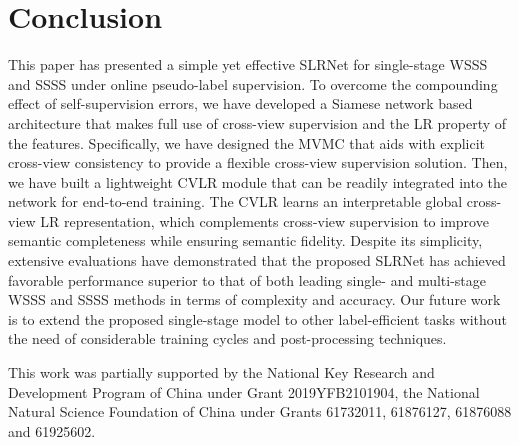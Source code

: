 \documentclass[twocolumn]{svjour3}          \smartqed  \usepackage{graphicx}
\begin{document}
\section{Conclusion}
This paper has presented a simple yet effective SLRNet for single-stage WSSS and SSSS under online pseudo-label supervision.
To overcome the compounding effect of self-supervision errors, we have developed a Siamese network based architecture that makes full use of cross-view supervision and the LR property of the features.
Specifically, we have designed the MVMC that aids with explicit cross-view consistency to provide a flexible cross-view supervision solution.
Then, we have built a lightweight CVLR module that can be readily integrated into the network for end-to-end training.
The CVLR learns an interpretable global cross-view LR representation, which complements cross-view supervision to improve semantic completeness while ensuring semantic fidelity.
Despite its simplicity, extensive evaluations have demonstrated that the proposed SLRNet has achieved favorable performance superior to that of both leading single- and multi-stage WSSS and SSSS methods in terms of complexity and accuracy.
Our future work is to extend the proposed single-stage model to other label-efficient tasks without the need of considerable training cycles and post-processing techniques.


\begin{acknowledgements}
This work was partially supported by the National Key Research and Development Program of China under Grant 2019YFB2101904, the National Natural Science Foundation of China under Grants 61732011, 61876127, 61876088 and 61925602.
\end{acknowledgements}







\end{document}
